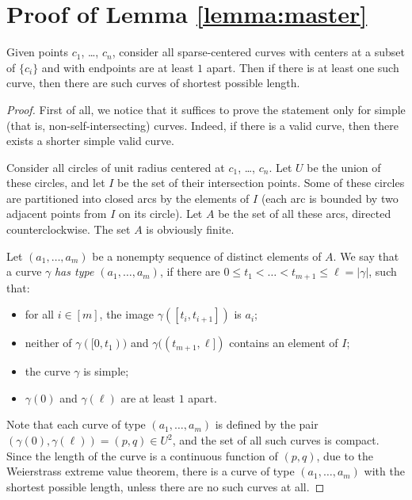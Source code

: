 \section{Proof of Lemma \ref{lemma:master}}

\begin{observation}
Given points $c_1$, \ldots, $c_n$, consider all sparse-centered curves with centers at a subset of $\{c_i\}$ and with endpoints are at least $1$ apart. Then if there is at least one such curve, then there are such curves of shortest possible length.
\end{observation}

\begin{proof}
First of all, we notice that it suffices to prove the statement only for simple (that is, non-self-intersecting) curves. Indeed, if there is a valid curve, then there exists a shorter simple valid curve.

Consider all circles of unit radius centered at $c_1$, \ldots, $c_n$. Let $U$ be the union of these circles, and let $I$ be the set of their intersection points. Some of these circles are partitioned into closed arcs by the elements of $I$ (each arc is bounded by two adjacent points from $I$ on its circle). Let $A$ be the set of all these arcs, directed counterclockwise. The set $A$ is obviously finite.

Let $(a_1, \ldots, a_m)$ be a nonempty sequence of distinct elements of $A$. We say that a curve $\gamma$ \emph{has type $(a_1, \ldots, a_m)$}, if there are $0 \leq t_1 < \ldots < t_{m+1} \leq \ell = |\gamma|$, such that:

\begin{itemize}
    \item for all $i\in[m]$, the image $\gamma([t_i, t_{i+1}])$ is $a_i$;
    \item neither of $\gamma([0, t_1))$ and $\gamma((t_{m+1}, \ell])$ contains an element of $I$;
    \item the curve $\gamma$ is simple;
    \item $\gamma(0)$ and $\gamma(\ell)$ are at least $1$ apart.
\end{itemize}

Note that each curve of type $(a_1, \ldots, a_m)$ is defined by the pair $(\gamma(0), \gamma(\ell)) = (p, q) \in U^2$, and the set of all such curves is compact. Since the length of the curve is a continuous function of $(p, q)$, due to the Weierstrass extreme value theorem, there is a curve of type $(a_1, \ldots, a_m)$ with the shortest possible length, unless there are no such curves at all.


\end{proof}
